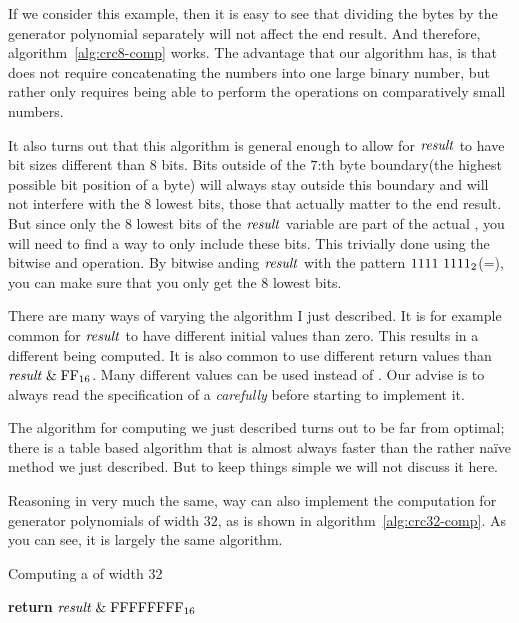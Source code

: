If we consider this example, then it is easy to see that dividing the
bytes by the generator polynomial separately will not affect the end
result. And therefore, algorithm~\ref{alg:crc8-comp} works. The
advantage that our algorithm has, is that does not require
concatenating the numbers into one large binary number, but rather
only requires being able to perform the operations on comparatively
small numbers.

It also turns out that this algorithm is general enough to allow for
$\mathit{result}$ to have bit sizes different than 8 bits. Bits outside of the
$7$:th byte boundary(the highest possible bit position of a byte) will
always stay outside this boundary and will not interfere with the 8
lowest bits, those that actually matter to the end result. But since
only the 8 lowest bits of the $\mathit{result}$ variable are part of the actual
\crc, you will need to find a way to only include these bits. This
trivially done using the bitwise and operation. By bitwise anding
$\mathit{result}$ with the pattern $\mbox{\ensuremath{1111\ 1111_2}}$(=), you can make sure
that you only get the 8 lowest bits.

There are many ways of varying the algorithm I just described. It is
for example common for $\mathit{result}$ to have different initial values
than zero. This results in a different \crc being computed. It is also
common to use different return values than \mbox{$\mathit{result} \mathrel{\&}
  \mbox{\ensuremath{\mathrm{FF}_{16}}}$}. Many different values can be used instead of
. Our advise is to always read the specification of a \crc
\textit{carefully} before starting to implement it.

The algorithm for computing \crc we just described turns out to be far
from optimal; there is a table based algorithm that is almost always
faster than the rather na\"{i}ve method we just described. But to keep
things simple we will not discuss it here.

Reasoning in very much the same, way can also implement the \crc
computation for generator polynomials of width $32$, as is shown in
algorithm~\ref{alg:crc32-comp}. As you can see, it is largely the same
algorithm.

\begin{algorithm}[H]
  \caption{Computing a \crc of width 32}
  \label{alg:crc32-comp}
  \begin{algorithmic}[1]


    \Else
    \EndIf
    \EndRepeatn

    \EndForEach

    \State \textbf{return}  $\mathit{result} \mathrel{\&} \mbox{\ensuremath{\mathrm{FFFFFFFF}_{16}}}$
    \EndProcedure

  \end{algorithmic}
\end{algorithm}

